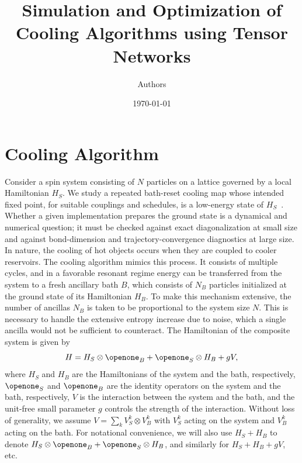 \documentclass[aps,pra,twocolumn,superscriptaddress,nolongbibliography,nobalancelastpage,10pt]{revtex4-2}
\begin{document}
\title{Simulation and Optimization of Cooling Algorithms using Tensor Networks}
\author{Authors}

\date{\today}
\maketitle


\section{Cooling Algorithm}

Consider a spin system consisting of $N$ particles on a lattice governed by a local Hamiltonian $H_S$. We study a repeated bath-reset cooling map whose intended fixed point, for suitable couplings and schedules, is a low-energy state of $H_S$~\cite{Terhal2000Problem,Kraus2008Preparation,Diehl2008Quantum,Verstraete2009Quantum,Shabani2016Artificial,Metcalf2020Engineered,Polla2021Quantum,Shtanko2021Algorithms}. Whether a given implementation prepares the ground state is a dynamical and numerical question; it must be checked against exact diagonalization at small size and against bond-dimension and trajectory-convergence diagnostics at large size.
In nature, the cooling of hot objects occurs when they are coupled to cooler reservoirs. The cooling algorithm mimics this process. It consists of multiple cycles, and in a favorable resonant regime energy can be transferred from the system to a fresh ancillary bath $B$, which consists of $N_B$ particles initialized at the ground state of its Hamiltonian $H_B$. To make this mechanism extensive, the number of ancillas $N_B$ is taken to be proportional to the system size $N$. This is necessary to handle the extensive entropy increase due to noise, which a single ancilla would not be sufficient to counteract.
The Hamiltonian of the composite system is given by
\begin{equation}
	H = H_S \otimes \Id_B + \Id_S \otimes H_B + gV,
	\label{eq:Ham}
\end{equation}
where $H_S$ and $H_B$ are the Hamiltonians of the system and the bath, respectively, $\Id_S$ and $\Id_B$ are the identity operators on the system and the bath, respectively, $V$ is the interaction between the system and the bath, and the unit-free small parameter $g$ controls the strength of the interaction.
Without loss of generality, we assume $V = \sum_k V_S^k \otimes V_B^k$ with $V_S^k$ acting on the system and $V_B^k$ acting on the bath.
For notational convenience, we will also use $H_S + H_B$ to denote $H_S \otimes \Id_B + \Id_S \otimes H_B$, and similarly for $H_S + H_B + gV$, etc.
\end{document}

